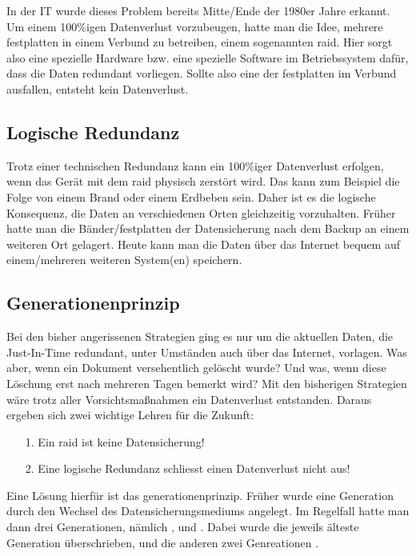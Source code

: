 In der IT wurde dieses Problem bereits Mitte/Ende der 1980er Jahre erkannt. Um
einem 100\%igen Datenverlust vorzubeugen, hatte man die Idee, mehrere
\gls{festplatte}n in einem Verbund zu betreiben, einem sogenannten \gls{raid}.
Hier sorgt also eine spezielle Hardware bzw. eine spezielle Software im
Betriebssystem dafür, dass die Daten redundant vorliegen. Sollte also eine der
\gls{festplatte}n im Verbund ausfallen, entsteht kein Datenverlust.

\subsection{Logische Redundanz}

Trotz einer technischen Redundanz kann ein 100\%iger Datenverlust erfolgen,
wenn das Gerät mit dem \gls{raid} physisch zerstört wird. Das kann zum Beispiel
die Folge von einem Brand oder einem Erdbeben sein. Daher ist es die logische
Konsequenz, die Daten an verschiedenen Orten gleichzeitig vorzuhalten. Früher
hatte man die Bänder/\gls{festplatte}n der Datensicherung nach dem Backup an
einem weiteren Ort gelagert. Heute kann man die Daten über das Internet bequem
auf einem/mehreren weiteren System(en) speichern.

\subsection{Generationenprinzip}

Bei den bisher angerissenen Strategien ging es nur um die aktuellen Daten, die
Just-In-Time redundant, unter Umständen auch über das Internet, vorlagen. Was
aber, wenn ein Dokument versehentlich gelöscht wurde? Und was, wenn diese
Löschung erst nach mehreren Tagen bemerkt wird? Mit den bisherigen Strategien
wäre trotz aller Vorsichtsmaßnahmen ein Datenverlust entstanden. Daraus ergeben
sich zwei wichtige Lehren für die Zukunft:

\begin{itemize}
    \item [1.] Ein \gls{raid} ist keine Datensicherung!
    \item [2.] Eine logische Redundanz schliesst einen Datenverlust nicht aus!
\end{itemize}

Eine Lösung hierfür ist das \gls{generationenprinzip}. Früher wurde eine
Generation durch den Wechsel des Datensicherungsmediums angelegt. Im Regelfall
hatte man dann drei Generationen, nämlich ,
 und . Dabei wurde die jeweils älteste
Generation überschrieben, und die anderen zwei Genreationen .
\bigskip

